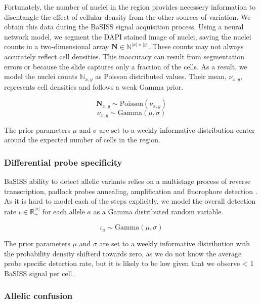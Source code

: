 Fortunately, the number of nuclei in the region provides necessery information to disentangle the effect of cellular density from the other sources of variation. We obtain this data during the \ac{BaSISS} signal acquisition process. Using a neural network model, we segment the DAPI stained image of nuclei, saving the nuclei counts in a two-dimensional array $\mathbf{N} \in \mathbb{N}^{|x| \times |y|}$. These counts may not always accurately reflect cell densities. This inaccuracy can result from segmentation errors or because the slide captures only a fraction of the cells. As a result, we model the nuclei counts $\mathbb{N}_{x,y}$ as Poisson distributed values. Their mean, $\nu_{x,y}$, represents cell densities and follows a weak Gamma prior.

\begin{equation}
    \mathbf{N}_{x,y} \sim \text{Poisson}({\nu}_{x,y})
\end{equation}
\begin{equation}
    {\nu}_{x,y} \sim \text{Gamma}(\mu, \sigma)
\end{equation}

The prior parameters $\mu$ and $\sigma$ are set to a weekly informative distribution center around the expected number of cells in the region.

\subsubsection*{Differential probe specificity}

\ac{BaSISS} ability to detect allelic variants relies on a multistage process of reverse transcription, padlock probes annealing, amplification and fluorophore detection \parencite{Svedlund2019-xb}. As it is hard to model each of the steps explicitly, we model the overall detection rate $\iota \in \mathbb{R}^{|a|}_{+}$ for each allele $a$ as a Gamma distributed random variable.

\begin{equation}
    {\iota}_{a} \sim \text{Gamma}(\mu, \sigma)
\end{equation}

The prior parameters $\mu$ and $\sigma$ are set to a weekly informative distribution with the probability density shifterd towards zero, as we do not know the average probe specific detection rate, but it is likely to be low given that we observe < 1 \ac{BaSISS} signal per cell.

\subsubsection*{Allelic confusion}
\label{sec:allelic-confusion}

